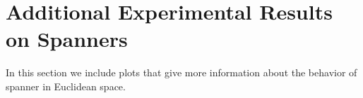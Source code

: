 \documentclass{ws-ijcga}
\newcommand{\ignore}[1]{}
\def \expDistDataPath {./}
\begin{document}


\appendix

\section{Additional Experimental Results on Spanners}
\label{sec:spanners_euclidean_addendum}
In this section we include plots that give more information
about the behavior of \bgrdy spanner in Euclidean space.

\ignore{
\begin{figure}[ht!]
    \begin{centering}
\begin{tikzpicture}
    \begin{axis}[xlabel=\# Points,ylabel=\# Edges,
        legend pos=outer north east]

    \addplot+ table [x=n_points, y=edges_blind_random, col sep=comma] {\expDistDataPath all_methods_dim_2_eps_0.1.txt};
    \addlegendentry{Blind random}

    \addplot+ table [x=n_points, y=edges_blind_random_connect_first, col sep=comma] {\expDistDataPath all_methods_dim_2_eps_0.1.txt};
    \addlegendentry{Blind random, connect first}


    \addplot+ table [x=n_points, y=edges_blind_random_lower_bound_first, col sep=comma] {\expDistDataPath all_methods_dim_2_eps_0.1.txt};
    \addlegendentry{Blind random, lower bound first}

    \addplot+ table [x=n_points, y=edges_blind_random_connect_first_lower_bound_first, col sep=comma] {\expDistDataPath all_methods_dim_2_eps_0.1.txt};
    \addlegendentry{Blind random, connect first, lower bound first}

\end{axis}
\end{tikzpicture}
\end{centering}
    \caption{Comparison of the four variants of \brndm algorithm.}
    \label{fig:blind_rbr_variants}
\end{figure}
}
\end{document}
